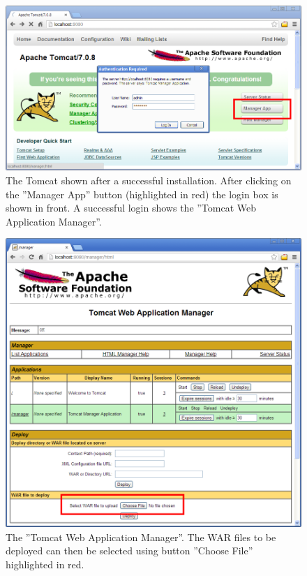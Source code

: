 \documentclass[a4paper,10pt,twoside]{book}
\begin{document}
\begin{figure}
\includegraphics[width=14cm]{tomcat_managerapp_login.png} 
\caption{The Tomcat shown after a successful installation. 
After clicking on the ''Manager App'' button (highlighted in red) the login box is shown in front.
A successful login shows the ''Tomcat Web Application Manager''.}
\end{figure}

\begin{figure}
\includegraphics[width=14cm]{tomcat_managerapp_selectwar.png}
\caption{The ''Tomcat Web Application Manager''.
The WAR files to be deployed can then be selected using button ''Choose File'' highlighted in red.}
\end{figure}
\end{document}
